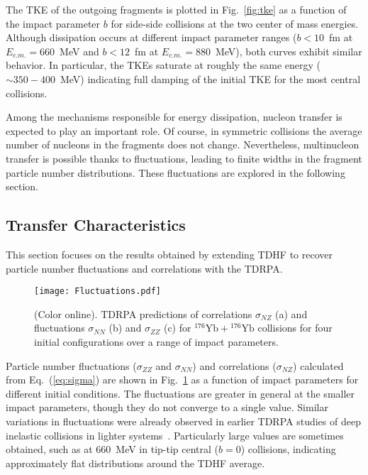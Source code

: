 \documentclass[reprint,aps,prc,twocolumn,superscriptaddress,floatfix,10pt]{revtex4-2}
\begin{document}
The TKE of the outgoing fragments is plotted in Fig.~\ref{fig:tke} 
as a function of the impact parameter $b$ for side-side collisions at the two center of mass energies.
Although dissipation occurs at different impact parameter ranges ($b<10$~fm at $E_{c.m.}=660$~MeV and $b<12$~fm at $E_{c.m.}=880$~MeV), both curves exhibit similar behavior.
In particular, the TKEs saturate at roughly the same energy ($\sim350-400$~MeV) indicating full damping of the initial TKE for the most central collisions.

Among the mechanisms responsible for energy dissipation, nucleon transfer is expected to play an important role. 
Of course, in symmetric collisions the average number of nucleons in the fragments does not change.
Nevertheless, multinucleon transfer is possible thanks to fluctuations, leading to finite widths in the fragment particle number distributions. 
These fluctuations are explored in the following section.

\subsection{Transfer Characteristics}\label{sec:tran}

This section focuses on the results obtained by extending TDHF to recover particle number fluctuations and correlations with the TDRPA.

\begin{figure}[!htb]
	\texttt{[image: Fluctuations.pdf]}
	\caption{\protect(Color online). TDRPA predictions of correlations $\sigma_{NZ}$ (a) and fluctuations $\sigma_{NN}$ (b) and $\sigma_{ZZ}$ (c) for $^{176}\mathrm{Yb}+{}^{176}\mathrm{Yb}$ collisions for four initial configurations over a range of impact parameters.}
	\label{fig:fluc}
\end{figure}

Particle number fluctuations ($\sigma_{ZZ}$ and $\sigma_{NN}$) and correlations ($\sigma_{NZ}$) calculated from Eq.~(\ref{eq:sigma}) are shown in Fig.~\ref{fig:fluc} as a function of  impact parameters for different initial conditions.
The fluctuations are greater in general at the smaller impact parameters, though they do not converge to a single value.
Similar variations in fluctuations were already observed in earlier TDRPA studies of deep inelastic collisions in lighter systems~\cite{simenel2011,williams2018}. 
Particularly large values are sometimes obtained, such as at 660~MeV in tip-tip central ($b=0$) collisions, indicating approximately flat distributions around the TDHF average.
\end{document}
